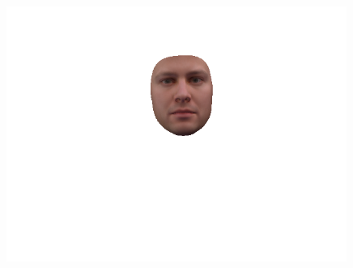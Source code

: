 \begin{figure}[h]
\begin{minipage}{.325\textwidth}
      \includegraphics[width=0.99\textwidth]{Figures/dataset/2D/3.png}
    \end{minipage}


\end{figure}
